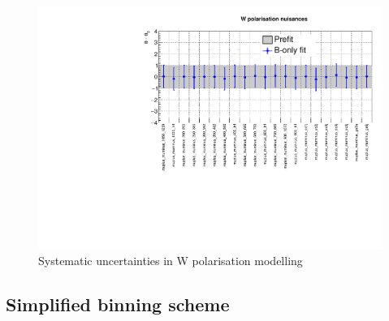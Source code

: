 \clearpage
\begin{figure}[h!]
  \centering
  \caption{Systematic uncertainties in W polarisation modelling}
  \includegraphics[width=0.8\linewidth]{figures/results/36invfb_preapproval/postfit/nuis/WPol_nuisances}
\end{figure}

\clearpage
\subsection{Simplified binning scheme}
\label{app:aggregated}

\newcommand{\customcaption}[5]{(Upper panel) Event yields observed in
  data (solid circles) and SM expectations with their associated
  uncertainties (blue histogram with grey shaded band) determined from
  a simultaneous fit to data in the control regions only (CR-only
  fit). Event yields and expectations are shown as a function of
  \HTmiss for events in the #1 topology that are required to satisfy
  #2, #3, and (\cmsLeft) #4 or (\cmsRight) #5. 
  (Lower panel) The significance of deviations (pulls) observed in
  data with respect to both the SM expectations from the CR-only fit,
  expressed in terms of the total uncertainty in the SM
  expectations. The pulls cannot be considered independently due to
  inter-bin correlations.}

